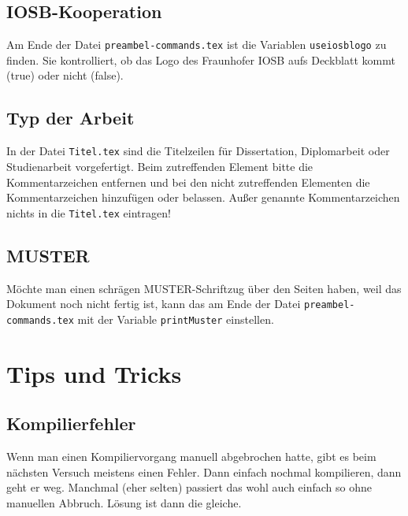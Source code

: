 \subsection{IOSB-Kooperation}
Am Ende der Datei \texttt{preambel-commands.tex} ist die Variablen \texttt{useiosblogo} zu finden. Sie kontrolliert, ob das Logo des Fraunhofer IOSB aufs Deckblatt kommt (true) oder nicht (false).

\subsection{Typ der Arbeit}
In der Datei \texttt{Titel.tex} sind die Titelzeilen für Dissertation, Diplomarbeit oder Studienarbeit vorgefertigt. Beim zutreffenden Element bitte die Kommentarzeichen entfernen und bei den nicht zutreffenden Elementen die Kommentarzeichen hinzufügen oder belassen. Außer genannte Kommentarzeichen nichts in die \texttt{Titel.tex} eintragen!

\subsection{MUSTER}
Möchte man einen schrägen MUSTER-Schriftzug über den Seiten haben, weil das Dokument noch nicht fertig ist, kann das am Ende der Datei \texttt{preambel-commands.tex} mit der Variable \texttt{printMuster} einstellen.

%
%
\section{Tips und Tricks}
\label{sec:tipstricks}
\subsection{Kompilierfehler}
Wenn man einen Kompiliervorgang manuell abgebrochen hatte, gibt es beim nächsten Versuch meistens einen Fehler. Dann einfach nochmal kompilieren, dann geht er weg. Manchmal (eher selten) passiert das wohl auch einfach so ohne manuellen Abbruch. Lösung ist dann die gleiche.

